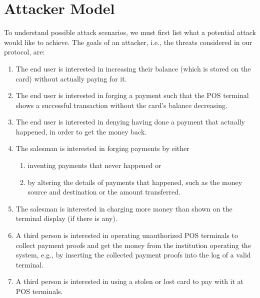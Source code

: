 \documentclass{article}
\begin{document}
\section{Attacker Model}\label{attackerModel}
To understand possible attack scenarios, we must first list what a potential attack would like to achieve.
The goals of an attacker, i.e., the threats considered in our protocol, are:
\begin{enumerate}[label={T\arabic*:}, leftmargin=2\parindent, ref={T\arabic*}]
    \item \label{threat:increaseWithoutPaying}
    The end user is interested in increasing their balance (which is stored on the card) without actually paying for it.
    
    \item \label{threat:payWithoutDecrease}
    The end user is interested in forging a payment such that the POS terminal shows a successful transaction without the card's balance decreasing.
    
    \item \label{threat:denyPayment}
    The end user is interested in denying having done a payment that actually happened, in order to get the money back.
    
    \item \label{threat:forgingPayments} The salesman is interested in forging payments by either 
    \begin{enumerate}[ref={\theenumi~\alph*}]
        \item \label{threat:inventNewPayments}
        inventing payments that never happened or
        \item \label{threat:alterPaymentDetails}
        by altering the details of payments that happened, such as the money source and destination or the amount transferred.
    \end{enumerate}
        
    \item \label{threat:chargeMoreThanDisplayed}
    The salesman is interested in charging more money than shown on the terminal display (if there is any).

    \item \label{threat:invaldTermial} A third person is interested in operating unauthorized POS terminals to collect payment proofs and get the money from the institution operating the system, e.g., by inserting the collected payment proofs into the log of a valid terminal.

    \item \label{threat:stolenCard} A third person is interested in using a stolen or lost card to pay with it at POS terminals.
\end{enumerate}
\end{document}
